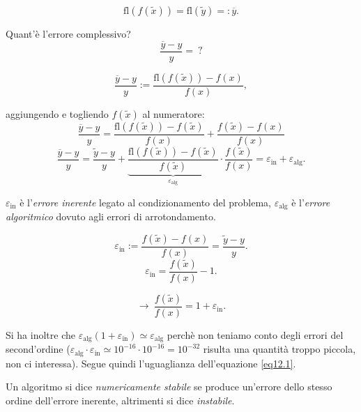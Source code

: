 \[\textrm{fl}(f(\tilde{x})) = \textrm{fl}(\tilde{y}) =: \overline{y}.\]

Quant'è l'errore complessivo?
\[\frac{\overline{y}-y}{y} =\ ?\]

\[
\frac{\overline{y}-y}{y} := \frac{\textrm{fl}(f(\tilde{x}))-f(x)}{f(x)},
\]

aggiungendo e togliendo $f(\tilde{x})$ al numeratore:
\[\frac{\overline{y}-y}{y}=
\frac{\textrm{fl}(f(\tilde{x}))-f(\tilde{x})}{f(x)} + \frac{f(\tilde{x}) - 
f(x)}{f(x)}\]
\begin{equation}\label{eq12.1}
\frac{\overline{y}-y}{y}=
\frac{\tilde{y}-y}{y} + \underbrace{\frac{\textrm{fl}(f(\tilde{x}))-
f(\tilde{x})}{f(\tilde{x})}}_{\varepsilon_{\textrm{alg}}} \cdot 
\frac{f(\tilde{x})}{f(x)} =
\varepsilon_{\textrm{in}} + \varepsilon_{\textrm{alg}}.
\end{equation}

$\varepsilon_{\textrm{in}}$ è l'\emph{errore inerente} legato al condizionamento
del problema, $\varepsilon_{\textrm{alg}}$ è l'\emph{errore algoritmico} dovuto
agli errori di arrotondamento.

\[\varepsilon_{\textrm{in}} := 
\frac{f(\tilde{x}) - f(x)}{f(x)} = \frac{\tilde{y}-y}{y}.\]
\[\varepsilon_{\textrm{in}} = \frac{f(\tilde{x})}{f(x)} -1.\]

\[\longrightarrow \
\frac{f(\tilde{x})}{f(x)} = 1 + \varepsilon_{\textrm{in}}.
\]

Si ha inoltre che $\varepsilon_{\textrm{alg}}(1 + \varepsilon_{\textrm{in}}) \simeq
\varepsilon_{\textrm{alg}}$ perchè non teniamo conto degli errori del 
second'ordine ($\varepsilon_{\textrm{alg}}\cdot\varepsilon_{\textrm{in}} 
\simeq 10^{-16}\cdot 10^{-16} = 10^{-32}$ risulta una quantità troppo piccola,
non ci interessa).
Segue quindi l'uguaglianza dell'equazione \ref{eq12.1}.

\begin{defi}
Un algoritmo si dice \emph{numericamente stabile} se produce un'errore dello
stesso ordine dell'errore inerente, altrimenti si dice \emph{instabile}.
\end{defi}

